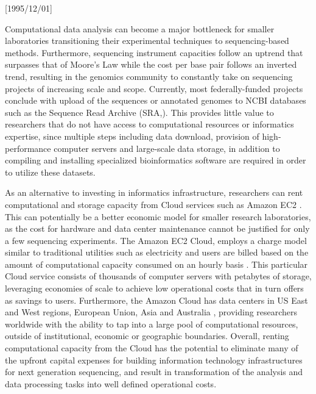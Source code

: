 \NeedsTeXFormat{LaTeX2e}[1995/12/01] \documentclass[10pt]{bmc_article}
\newenvironment{bmcformat}{\begin{raggedright}\baselineskip20pt\sloppy\setboolean{publ}{false}}{\end{raggedright}\baselineskip20pt\sloppy}
\begin{document}
\begin{bmcformat}
Computational data analysis can become a major bottleneck for smaller laboratories transitioning their experimental 
techniques to sequencing-based methods. Furthermore, sequencing instrument capacities follow an uptrend that surpasses 
that of Moore's Law \cite{schaller1997moore} while the cost per base pair follows an inverted trend, resulting in the genomics 
community to constantly take on sequencing projects of increasing scale and scope. Currently, most federally-funded projects 
conclude with upload of the sequences or annotated genomes to NCBI \cite{ncbi} databases such as the Sequence  
Read Archive (SRA,\cite{sra}). This provides little value  to researchers that do not have access to computational resources 
or informatics expertise, since multiple steps including data download, provision of high-performance computer servers and large-scale data storage, in addition to 
compiling and installing specialized bioinformatics software are required in order to utilize these datasets. \pb

As an alternative to investing in informatics infrastructure, researchers can rent computational 
and storage capacity from Cloud services such as Amazon EC2 \cite{awsec2}. This can potentially be
a better economic model for smaller research laboratories, as the cost for hardware and data center 
maintenance cannot be justified for only a few sequencing experiments. The Amazon EC2 Cloud,  
employs a charge model similar to traditional utilities such as electricity and users are billed based 
on the amount of computational capacity consumed on an hourly basis \cite{ec2price}. This particular Cloud 
service consists of thousands of computer servers with petabytes of storage, leveraging economies of 
scale to achieve low operational costs that in turn offers as savings to users. Furthermore, the Amazon Cloud 
has data centers in US East and West regions, European Union, Asia and Australia \cite{ec2regions}, providing researchers 
worldwide with the ability to tap into a large pool of computational resources, outside of institutional, 
economic or geographic boundaries. Overall, renting computational capacity from the Cloud has the 
potential to eliminate many of the upfront capital expenses for building information technology infrastructures 
for next generation sequencing, and result in transformation of the analysis and data processing tasks into well 
defined operational costs.  \pb


\end{bmcformat}
\end{document}
